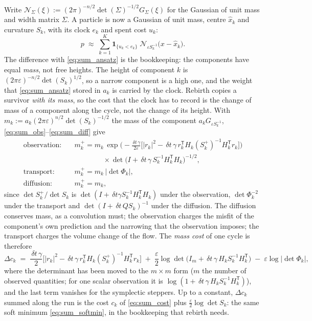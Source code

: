 \documentclass[11pt,a4paper]{article}
\newcommand{\T}{^{\mathsf T}}
\newcommand{\xh}{\hat{x}}
\newcommand{\eps}{\varepsilon}
\newcommand{\abs}[1]{\left\lvert #1 \right\rvert}
\newcommand{\dt}{\,\delta t}
\theoremstyle{plain}
\theoremstyle{definition}
\theoremstyle{remark}
\begin{document}
Write $\mathcal N_\Sigma(\xi):=(2\pi)^{-n/2}\det(\Sigma)^{-1/2}G_\Sigma(\xi)$ for the Gaussian of unit mass and width matrix $\Sigma$. A particle is now a Gaussian of unit mass, centre $\xh_k$ and curvature $S_k$, with its clock $e_k$ and spent cost $u_k$:
\begin{equation}
  p \;\approx\; \sum_{k=1}^K \mathbf 1_{\{u_k<e_k\}}\;\mathcal N_{\eps S_k^{-1}}\big(x-\xh_k\big).
  \label{eq:pop_ansatz}
\end{equation}
The difference with \eqref{eq:sum_ansatz} is the bookkeeping: the components have equal \emph{mass}, not free heights. The height of component $k$ is $(2\pi\eps)^{-n/2}\det(S_k)^{1/2}$, so a narrow component is a high one, and the weight that \eqref{eq:sum_ansatz} stored in $a_k$ is carried by the clock. Rebirth copies a survivor \emph{with its mass}, so the cost that the clock has to record is the change of mass of a component along the cycle, not the change of its height. With $m_k:=a_k(2\pi\eps)^{n/2}\det(S_k)^{-1/2}$ the mass of the component $a_kG_{\eps S_k^{-1}}$, \eqref{eq:sum_obs}--\eqref{eq:sum_diff} give
\begin{equation}
\begin{aligned}
  \text{observation:}\quad & m_k^+ = m_k\,\exp\Big(-\frac{\dt\,\gamma}{2\eps}\Big[\abs{r_k}^2-\dt\,\gamma\,r_k\T H_k(S_k^+)^{-1}H_k\T r_k\Big]\Big) \\
  & \qquad\qquad\times\det\big(I+\dt\,\gamma\,S_k^{-1}H_k\T H_k\big)^{-1/2}, \\
  \text{transport:}\quad & m_k^+ = m_k\,\abs{\det\Phi_k}, \\
  \text{diffusion:}\quad & m_k^+ = m_k ,
\end{aligned}
  \label{eq:pop_mass}
\end{equation}
since $\det S_k^+/\det S_k$ is $\det(I+\dt\gamma S_k^{-1}H_k\T H_k)$ under the observation, $\det\Phi_k^{-2}$ under the transport and $\det(I+\dt\,QS_k)^{-1}$ under the diffusion. The diffusion conserves mass, as a convolution must; the observation charges the misfit of the component's own prediction and the narrowing that the observation imposes; the transport charges the volume change of the flow. The \emph{mass cost} of one cycle is therefore
\begin{equation}
  \Delta c_k \;=\; \frac{\dt\,\gamma}{2}\Big[\abs{r_k}^2-\dt\,\gamma\,r_k\T H_k(S_k^+)^{-1}H_k\T r_k\Big]
  \;+\;\frac\eps2\log\det\big(I_m+\dt\,\gamma\,H_kS_k^{-1}H_k\T\big)
  \;-\;\eps\log\abs{\det\Phi_k},
  \label{eq:pop_cost}
\end{equation}
where the determinant has been moved to the $m\times m$ form ($m$ the number of observed quantities; for one scalar observation it is $\log(1+\dt\,\gamma\,H_kS_k^{-1}H_k\T)$), and the last term vanishes for the symplectic steppers. Up to a constant, $\Delta c_k$ summed along the run is the cost $c_k$ of \eqref{eq:sum_cost} plus $\tfrac\eps2\log\det S_k$: the same soft minimum \eqref{eq:sum_softmin}, in the bookkeeping that rebirth needs.
\end{document}

